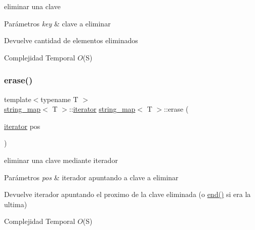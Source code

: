 eliminar una clave 


\begin{DoxyParams}{Parámetros}
{\em key} & clave a eliminar \\
\hline
\end{DoxyParams}
\begin{DoxyReturn}{Devuelve}
cantidad de elementos eliminados
\end{DoxyReturn}

\begin{DoxyDescription}
\item[Complejidad Temporal]$O$(S)
\end{DoxyDescription}\mbox{\label{classstring__map_aad96e9f05f2a7f4196331e0fcba3bae7}} 
\subsubsection{\texorpdfstring{erase()}{erase()}\hspace{0.1cm}{\footnotesize\ttfamily [2/2]}}
{\footnotesize\ttfamily template$<$typename T $>$ \\
\mbox{\hyperlink{classstring__map}{string\+\_\+map}}$<$ T $>$\+::\mbox{\hyperlink{classstring__map_1_1iterator}{iterator}} \mbox{\hyperlink{classstring__map}{string\+\_\+map}}$<$ T $>$\+::erase (\begin{DoxyParamCaption}\item[{\mbox{\hyperlink{classstring__map_1_1iterator}{iterator}}}]{pos }\end{DoxyParamCaption})}



eliminar una clave mediante iterador 


\begin{DoxyParams}{Parámetros}
{\em pos} & iterador apuntando a clave a eliminar \\
\hline
\end{DoxyParams}
\begin{DoxyReturn}{Devuelve}
iterador apuntando el proximo de la clave eliminada (o \mbox{\hyperlink{classstring__map_ab063b2f78945d192c5ef3ccc68db8e80}{end()}} si era la ultima)
\end{DoxyReturn}

\begin{DoxyDescription}
\item[Complejidad Temporal]$O$(S)
\end{DoxyDescription}\mbox{\label{classstring__map_abbe345fcf0ece43b416ea0e4699d95ed}} 
